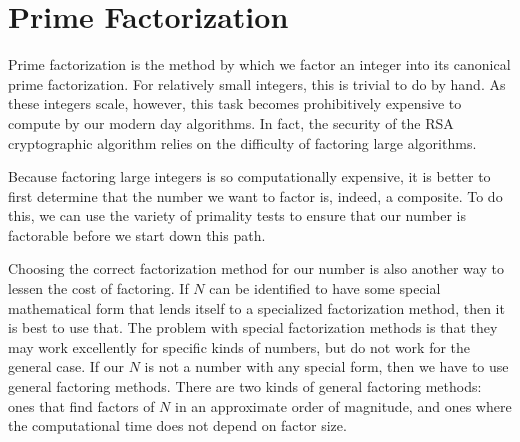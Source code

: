 \documentclass{article}
\begin{document}
\newpage



\section{Prime Factorization}

\par Prime factorization is the method by which we factor an integer into its canonical prime factorization.
For relatively small integers, this is trivial to do by hand. As these integers scale, however, this task
becomes prohibitively expensive to compute by our modern day algorithms. In fact, the security of the RSA
cryptographic algorithm relies on the difficulty of factoring large algorithms.

\par Because factoring large integers is so computationally expensive, it is better to first determine that
the number we want to factor is, indeed, a composite. To do this, we can use the variety of primality tests
to ensure that our number is factorable before we start down this path.

\par Choosing the correct factorization method for our number is also another way to lessen the cost of
factoring. If $N$ can be identified to have some special mathematical form that lends itself to a specialized
factorization method, then it is best to use that. The problem with special factorization methods is that
they may work excellently for specific kinds of numbers, but do not work for the general case. If our $N$ is
not a number with any special form, then we have to use general factoring methods. There are two kinds of
general factoring methods: ones that find factors of $N$ in an approximate order of magnitude, and ones where
the computational time does not depend on factor size.
\end{document}

